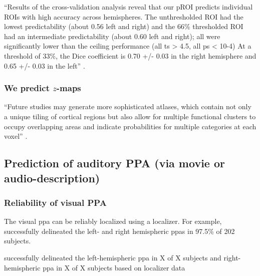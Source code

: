 ``Results of the cross-validation analysis reveal that our pROI predicts
individual ROIs with high accuracy across hemispheres.
%
The unthresholded ROI had the lowest predictability (about 0.56 left and right)
and the 66\% thresholded ROI had an intermediate predictability (about 0.60 left
and right); all were significantly lower than the ceiling performance (all ts >
4.5, all ps < 10-4)
%
At a threshold of 33\%, the Dice coefficient is 0.70 +/- 0.03 in the right
hemisphere and 0.65 +/- 0.03 in the left'' \citep{weiner2018defining}.



\subsubsection{We predict $z$-maps}




``Future studies may generate more sophisticated atlases, which contain not only
a unique tiling of cortical regions but also allow for multiple functional
clusters to occupy overlapping areas and indicate probabilities for multiple
categories at each voxel'' \citep{rosenke2021probabilistic}.








\subsection{Prediction of auditory PPA (via movie or audio-description)}


\subsubsection{Reliability of visual PPA}

The visual \ac{ppa} can be reliably localized using a localizer.
%
For example, \citet{zhen2017quantifying} successfully delineated the left- and
right hemispheric \acp{ppa} in 97.5\% of 202 subjects.

\citet{sengupta2016extension} successfully delineated the left-hemispheric
\ac{ppa} in X of X subjects and right-hemispheric \ac{ppa} in X of X subjects
based on localizer data

